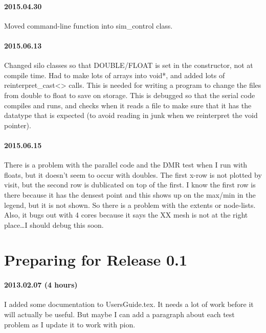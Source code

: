 \documentclass[a4paper,11pt]{article}
\begin{document}
\paragraph{2015.04.30}
Moved command-line function into sim\_control class.

\paragraph{2015.06.13}
Changed silo classes so that DOUBLE/FLOAT is set in the constructor, not at compile time.
Had to make lots of arrays into void*, and added lots of reinterpret\_cast<> calls.
This is needed for writing a program to change the files from double to float to save on storage.
This is debugged so that the serial code compiles and runs, and checks when it reads a file to make sure that it has the datatype that is expected (to avoid reading in junk when we reinterpret the void pointer).


\paragraph{2015.06.15}
There is a problem with the parallel code and the DMR test when I run with floats, but it doesn't seem to occur with doubles.  The first x-row is not plotted by visit, but the second row is dublicated on top of the first.
I know the first row is there because it has the densest point and this shows up on the max/min in the legend, but it is not shown.
So there is a problem with the extents or node-lists.
Also, it bugs out with 4 cores because it says the XX mesh is not at the right place\ldots I should debug this soon.

\section{Preparing for Release 0.1}
\paragraph{2013.02.07 (4 hours)}
I added some documentation to UsersGuide.tex.
It needs a lot of work before it will actually be useful.
But maybe I can add a paragraph about each test problem as I update it to work with pion.
\end{document}
